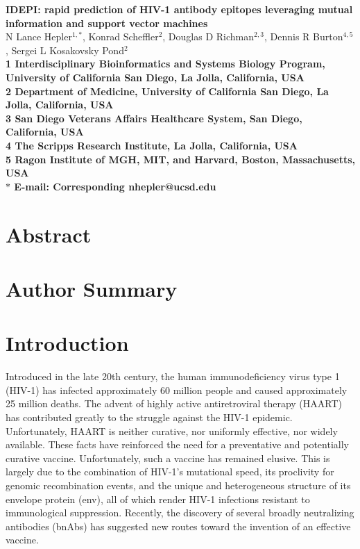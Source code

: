 \documentclass[10pt]{article}
\date{}
\newcommand{\idepi}{{IDEPI}}
\newcommand{\hiv}{{HIV}-1}
\begin{document}
\begin{flushleft}
{\Large
\textbf{\idepi{}: rapid prediction of \hiv{} antibody epitopes leveraging mutual information and support vector machines}
}
\\
N Lance Hepler$^{1,\ast}$,
Konrad Scheffler$^{2}$,
Douglas D Richman$^{2,3}$,
Dennis R Burton$^{4,5}$,
Sergei L Kosakovsky Pond$^{2}$
\\
\bf{1} Interdisciplinary Bioinformatics and Systems Biology Program, University of California San Diego, La Jolla, California, USA
\\
\bf{2} Department of Medicine, University of California San Diego, La Jolla, California, USA
\\
\bf{3} San Diego Veterans Affairs Healthcare System, San Diego, California, USA
\\
\bf{4} The Scripps Research Institute, La Jolla, California, USA
\\
\bf{5} Ragon Institute of {MGH}, {MIT}, and Harvard, Boston, Massachusetts, USA
\\
$\ast$ E-mail: Corresponding nhepler@ucsd.edu
\end{flushleft}

\section*{Abstract}

\section*{Author Summary}

\section*{Introduction}
Introduced in the late 20th century,
the human immunodeficiency virus type 1 (\hiv{}) has infected approximately 60 million people
and caused approximately 25 million deaths.
The advent of highly active antiretroviral therapy ({HAART}) has contributed greatly to the struggle against the \hiv{} epidemic.
Unfortunately, HAART is neither curative, nor uniformly effective, nor widely available.
These facts have reinforced the need for a preventative and potentially curative vaccine.
Unfortunately, such a vaccine has remained elusive.
This is largely due to the combination of \hiv{}'s mutational speed,
its proclivity for genomic recombination events,
and the unique and heterogeneous structure of its envelope protein (env),
all of which render \hiv{} infections resistant to immunological suppression.
Recently, the discovery of several broadly neutralizing antibodies (bnAbs) has suggested new routes toward the invention of an effective vaccine.
\end{document}
